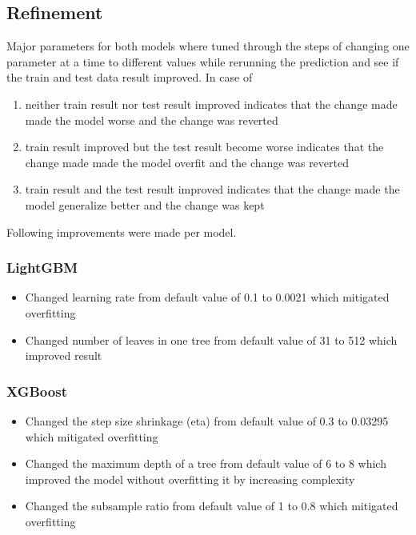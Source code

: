 \documentclass[a4paper]{article}
\begin{document}
\subsection{Refinement}
Major parameters for both models where tuned through the steps of changing one parameter at a time to different values while rerunning the prediction and see if the train and test data result improved. In case of
\begin{enumerate}
    \item neither train result nor test result improved indicates that the change made made the model worse and the change was reverted
    \item train result improved but the test result become worse indicates that the change made made the model overfit and the change was reverted
    \item train result and the test result improved indicates that the change made the model generalize better and the change was kept
\end{enumerate}

Following improvements were made per model.
\subsubsection{LightGBM}
\begin{itemize}
    \item Changed learning rate from default value of 0.1 to 0.0021 which mitigated overfitting
    \item Changed number of leaves in one tree from default value of 31 to 512 which improved result
\end{itemize}
\subsubsection{XGBoost}
\begin{itemize}
    \item Changed the step size shrinkage (eta) from default value of 0.3 to 0.03295 which mitigated overfitting
    \item Changed the maximum depth of a tree from default value of 6 to 8 which improved the model without overfitting it by increasing complexity
    \item Changed the subsample ratio from default value of 1 to 0.8 which mitigated overfitting
\end{itemize}
\end{document}
